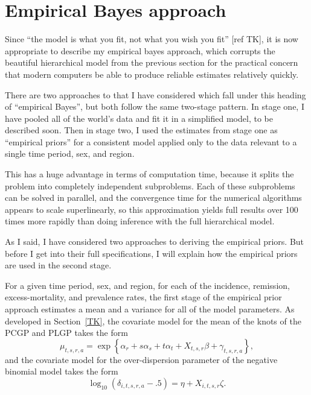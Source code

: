 \section{Empirical Bayes approach}
Since ``the model is what you fit, not what you wish you fit'' [ref TK], it is
now appropriate to describe my empirical bayes approach, which
corrupts the beautiful hierarchical model from the previous section
for the practical concern that modern computers be able to produce
reliable estimates relatively quickly.

There are two approaches to that I have considered which fall under
this heading of ``empirical Bayes'', but both follow the same
two-stage pattern.  In stage one, I have pooled all of the world's
data and fit it in a simplified model, to be described soon.  Then in
stage two, I used the estimates from stage one as ``empirical priors''
for a consistent model applied only to the data relevant to a single
time period, sex, and region.

This has a huge advantage in terms of computation time, because it
splits the problem into completely independent subproblems.  Each of
these subproblems can be solved in parallel, and the convergence time
for the numerical algorithms appears to scale superlinearly, so this
approximation yields full results over 100 times more rapidly than
doing inference with the full hierarchical model.

As I said, I have considered two approaches to deriving the empirical
priors.  But before I get into their full specifications, I will
explain how the empirical priors are used in the second stage.

For a given time period, sex, and region, for each of the incidence,
remission, excess-mortality, and prevalence rates, the
first stage of the empirical prior approach estimates a mean and a
variance for all of the model parameters.  As developed in
Section~\ref{TK}, the covariate model for the
mean of the knots of the PCGP and PLGP takes the form
\[
\mu_{t,s,r,a} = \exp\left\{\alpha_r + s\alpha_s + t\alpha_t +
X_{t,s,r}\beta + \gamma_{t,s,r,a}\right\},
\]
and the covariate model for the over-dispersion parameter of the negative binomial model takes the
form
\[
\log_{10}(\delta_{i,t,s,r,a}-.5) = \eta + X_{i,t,s,r}\zeta.
\]

